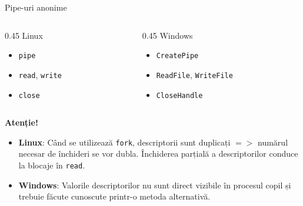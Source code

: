 \documentclass{so.cs.pub.ro}
\begin{document}
\begin{frame}{Pipe-uri anonime}
	\begin{columns}
		\begin{column} [1]{0.45\textwidth}
			Linux
			\vspace*{0.1cm}
			\begin{itemize}
				\item \texttt{pipe}
				\item \texttt{read}, \texttt{write}
				\item \texttt{close}			
			\end{itemize}
			
		\end{column}
				
		\begin{column} [1]{0.45\textwidth}
			Windows
			\vspace*{0.1cm}
			\begin{itemize}
				\item \texttt{CreatePipe}
				\item \texttt{ReadFile}, \texttt{WriteFile}
				\item \texttt{CloseHandle}
			\end{itemize}
		\end{column}
	\end{columns}

\vspace*{0.5cm}

\textbf{Atenție!} 

\begin{itemize}
	\item \textbf{Linux}: Când se utilizează \texttt{fork}, descriptorii sunt duplicați $=>$ numărul necesar de închideri se vor dubla. Închiderea parțială a descriptorilor conduce la blocaje în \texttt{read}.
	\item \textbf{Windows}: Valorile descriptorilor nu sunt direct vizibile în procesul copil și trebuie făcute cunoscute printr-o metoda alternativă.
\end{itemize}

\end{frame}
\end{document}
